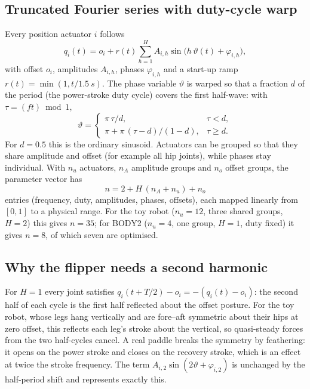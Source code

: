 \subsection{Truncated Fourier series with duty-cycle warp}
Every position actuator $i$ follows
\begin{equation}
  q_i(t)=o_i+r(t)\sum_{h=1}^{H}A_{i,h}\sin\!\big(h\,\vartheta(t)+\varphi_{i,h}\big),
  \label{eq:mj-gait}
\end{equation}
with offset $o_i$, amplitudes $A_{i,h}$, phases $\varphi_{i,h}$ and a start-up ramp
$r(t)=\min(1,t/\SI{1.5}{s})$. The phase variable $\vartheta$ is warped so that a
fraction $d$ of the period (the power-stroke duty cycle) covers the first half-wave:
with $\tau=(ft)\bmod 1$,
\begin{equation}
  \vartheta=\begin{cases}\pi\,\tau/d, & \tau<d,\\[2pt] \pi+\pi\,(\tau-d)/(1-d), & \tau\ge d.\end{cases}
\end{equation}
For $d=0.5$ this is the ordinary sinusoid. Actuators can be grouped so that they share
amplitude and offset (for example all hip joints), while phases stay individual. With
$n_u$ actuators, $n_A$ amplitude groups and $n_o$ offset groups, the parameter
vector has
\begin{equation}
  n = 2 + H\,(n_A+n_u) + n_o
\end{equation}
entries (frequency, duty, amplitudes, phases, offsets), each mapped linearly from $[0,1]$
to a physical range. For the toy robot ($n_u=12$, three shared groups, $H=2$) this
gives $n=35$; for BODY2 ($n_u=4$, one group, $H=1$, duty fixed) it gives $n=8$, of
which seven are optimised.

\subsection{Why the flipper needs a second harmonic}
\label{sec:mj-harmonic}
For $H=1$ every joint satisfies $q_i(t+T/2)-o_i=-(q_i(t)-o_i)$: the second half
of each cycle is the first half reflected about the offset posture. For the toy robot,
whose legs hang vertically and are fore--aft symmetric about their hips at zero
offset, this reflects each leg's stroke about the vertical, so quasi-steady forces from
the two half-cycles cancel. A real paddle breaks the symmetry by feathering: it
opens on the power stroke and closes on the recovery stroke, which is an effect at
twice the stroke frequency. The term $A_{i,2}\sin(2\vartheta+\varphi_{i,2})$ is
unchanged by the half-period shift and represents exactly this.

